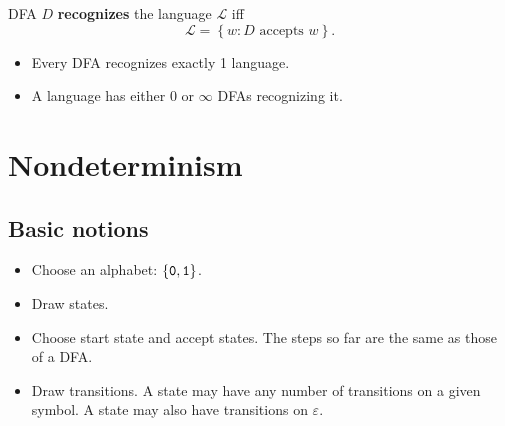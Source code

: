 \documentclass{notes}
\begin{document}
\begin{defn}
  DFA $D$ {\boldmath \bfseries recognizes} the language $\mathcal L$ iff 
  \[
    \mathcal L = \left \{ w : \text{$D$ accepts $w$} \right \}.
  \]
\end{defn}

\begin{note}
  \begin{itemize}
    \item Every DFA recognizes exactly 1 language.

    \item A language has either 0 or $\infty$ DFAs recognizing it.
  \end{itemize}
\end{note}

\section{Nondeterminism}

\subsection{Basic notions}

\begin{eg}
  \begin{center}
  \end{center}

  \begin{itemize}
    \item Choose an alphabet: $\left \{ \verb~0~, \verb~1~ \right \}$.

    \item Draw states.
      
    \item Choose start state and accept states.
    The steps so far are the same as those of a DFA.
      
    \item Draw transitions.
    A state may have any number of transitions on a given symbol.
    A state may also have transitions on $\varepsilon$.
  \end{itemize}
\end{eg}
\end{document}
